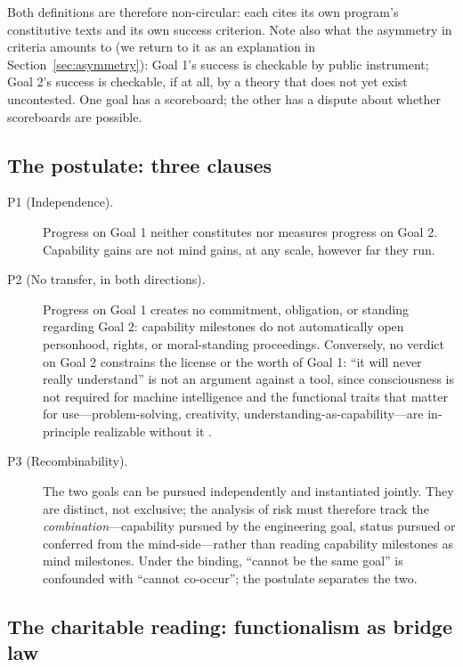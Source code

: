 \documentclass[10pt]{article}
\begin{document}
Both definitions are therefore non-circular: each cites its own program's constitutive texts and its own success criterion. Note also what the asymmetry in criteria amounts to (we return to it as an explanation in Section~\ref{sec:asymmetry}): Goal 1's success is checkable by public instrument; Goal 2's success is checkable, if at all, by a theory that does not yet exist uncontested. One goal has a scoreboard; the other has a dispute about whether scoreboards are possible.

\subsection{The postulate: three clauses}\label{sec:clauses}

\begin{description}
\item[P1 (Independence).] Progress on Goal 1 neither constitutes nor measures progress on Goal 2. Capability gains are not mind gains, at any scale, however far they run.
\item[P2 (No transfer, in both directions).] Progress on Goal 1 creates no commitment, obligation, or standing regarding Goal 2: capability milestones do not automatically open personhood, rights, or moral-standing proceedings. Conversely, no verdict on Goal 2 constrains the license or the worth of Goal 1: ``it will never really understand'' is not an argument against a tool, since consciousness is not required for machine intelligence and the functional traits that matter for use---problem-solving, creativity, understanding-as-capability---are in-principle realizable without it \cite{pesonen2026notobstacles}.
\item[P3 (Recombinability).] The two goals can be pursued independently and instantiated jointly. They are distinct, not exclusive; the analysis of risk must therefore track the \emph{combination}---capability pursued by the engineering goal, status pursued or conferred from the mind-side---rather than reading capability milestones as mind milestones. Under the binding, ``cannot be the same goal'' is confounded with ``cannot co-occur''; the postulate separates the two.
\end{description}

\subsection{The charitable reading: functionalism as bridge law}\label{sec:charitable}
\end{document}
